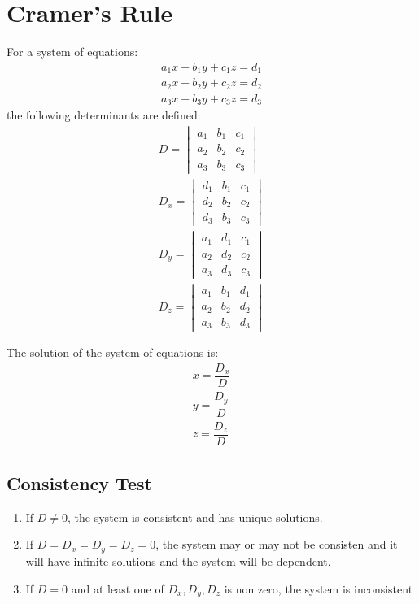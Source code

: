\section{Cramer's Rule}
For a system of equations:
\begin{align}
	a_1x+b_1y+c_1z=d_1\nonumber\\
	a_2x+b_2y+c_2z=d_2\nonumber\\
	a_3x+b_3y+c_3z=d_3\nonumber
\end{align}
the following determinants are defined:
\begin{align}
	D=\begin{vmatrix}a_1&b_1&c_1\\a_2&b_2&c_2\\a_3&b_3&c_3\end{vmatrix}\nonumber\\
	D_x=\begin{vmatrix}d_1&b_1&c_1\\d_2&b_2&c_2\\d_3&b_3&c_3\end{vmatrix}\nonumber\\
	D_y=\begin{vmatrix}a_1&d_1&c_1\\a_2&d_2&c_2\\a_3&d_3&c_3\end{vmatrix}\nonumber\\
	D_z=\begin{vmatrix}a_1&b_1&d_1\\a_2&b_2&d_2\\a_3&b_3&d_3\end{vmatrix}\nonumber
\end{align}

The solution of the system of equations is:
\begin{align}
	x=\dfrac{D_x}{D}\\
	y=\dfrac{D_y}{D}\\
	z=\dfrac{D_z}{D}
\end{align}

\subsection{Consistency Test}
\begin{enumerate}
	\item If $D\neq0$, the system is consistent and has unique solutions.
	\item If $D=D_x=D_y=D_z=0$, the system may or may not be consisten and it will have infinite solutions and the system will be dependent.
	\item If $D=0$ and at least one of $D_x, D_y, D_z$ is non zero, the system is inconsistent
\end{enumerate}
